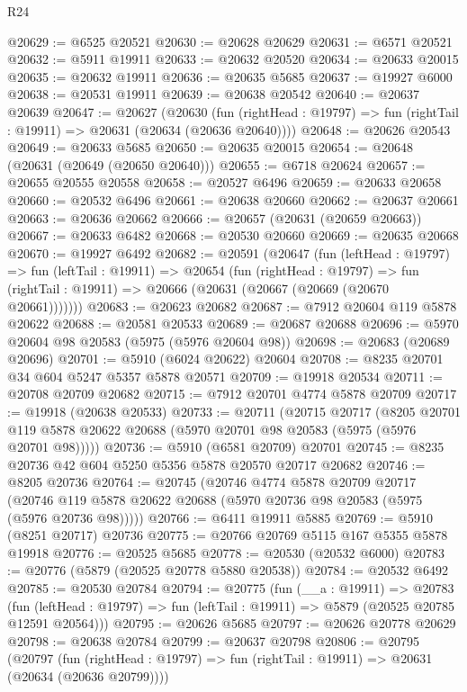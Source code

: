 \begin{lexlean}{R24}
\begin{coremodule}
@20629 := @6525 @20521
@20630 := @20628 @20629
@20631 := @6571 @20521
@20632 := @5911 @19911
@20633 := @20632 @20520
@20634 := @20633 @20015
@20635 := @20632 @19911
@20636 := @20635 @5685
@20637 := @19927 @6000
@20638 := @20531 @19911
@20639 := @20638 @20542
@20640 := @20637 @20639
@20647 := @20627
    (@20630
      (fun (rightHead : @19797) => fun (rightTail : @19911) => @20631 (@20634 (@20636 @20640))))
@20648 := @20626 @20543
@20649 := @20633 @5685
@20650 := @20635 @20015
@20654 := @20648 (@20631 (@20649 (@20650 @20640)))
@20655 := @6718 @20624
@20657 := @20655 @20555 @20558
@20658 := @20527 @6496
@20659 := @20633 @20658
@20660 := @20532 @6496
@20661 := @20638 @20660
@20662 := @20637 @20661
@20663 := @20636 @20662
@20666 := @20657 (@20631 (@20659 @20663))
@20667 := @20633 @6482
@20668 := @20530 @20660
@20669 := @20635 @20668
@20670 := @19927 @6492
@20682 := @20591
    (@20647
      (fun (leftHead : @19797) =>
      fun (leftTail : @19911) =>
      @20654
        (fun (rightHead : @19797) =>
        fun (rightTail : @19911) => @20666 (@20631 (@20667 (@20669 (@20670 @20661)))))))
@20683 := @20623 @20682
@20687 := @7912 @20604 @119 @5878 @20622
@20688 := @20581 @20533
@20689 := @20687 @20688
@20696 := @5970 @20604 @98 @20583 (@5975 (@5976 @20604 @98))
@20698 := @20683 (@20689 @20696)
@20701 := @5910 (@6024 @20622) @20604
@20708 := @8235 @20701 @34 @604 @5247 @5357 @5878 @20571
@20709 := @19918 @20534
@20711 := @20708 @20709 @20682
@20715 := @7912 @20701 @4774 @5878 @20709
@20717 := @19918 (@20638 @20533)
@20733 := @20711
    (@20715
      @20717
      (@8205 @20701 @119 @5878 @20622 @20688 (@5970 @20701 @98 @20583 (@5975 (@5976 @20701 @98)))))
@20736 := @5910 (@6581 @20709) @20701
@20745 := @8235 @20736 @42 @604 @5250 @5356 @5878 @20570 @20717 @20682
@20746 := @8205 @20736
@20764 := @20745
    (@20746
      @4774
      @5878
      @20709
      @20717
      (@20746 @119 @5878 @20622 @20688 (@5970 @20736 @98 @20583 (@5975 (@5976 @20736 @98)))))
@20766 := @6411 @19911 @5885
@20769 := @5910 (@8251 @20717) @20736
@20775 := @20766 @20769 @5115 @167 @5355 @5878 @19918
@20776 := @20525 @5685
@20778 := @20530 (@20532 @6000)
@20783 := @20776 (@5879 (@20525 @20778 @5880 @20538))
@20784 := @20532 @6492
@20785 := @20530 @20784
@20794 := @20775
    (fun (__a : @19911) =>
    @20783
      (fun (leftHead : @19797) => fun (leftTail : @19911) => @5879 (@20525 @20785 @12591 @20564)))
@20795 := @20626 @5685
@20797 := @20626 @20778 @20629
@20798 := @20638 @20784
@20799 := @20637 @20798
@20806 := @20795
    (@20797
      (fun (rightHead : @19797) => fun (rightTail : @19911) => @20631 (@20634 (@20636 @20799))))

\end{coremodule}
\end{lexlean}
